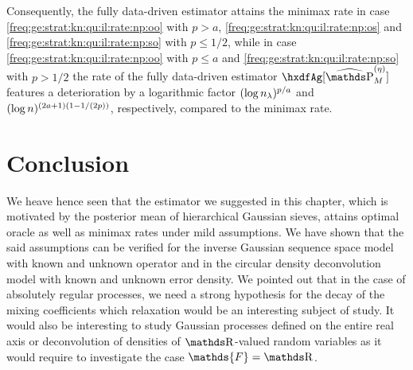 Consequently, the fully data-driven estimator attains the minimax
  rate in case \ref{freq:ge:strat:kn:qu:il:rate:np:oo} with $p>a$,
  \ref{freq:ge:strat:kn:qu:il:rate:np:os} and \ref{freq:ge:strat:kn:qu:il:rate:np:so} with
  $p\leq1/2$, while in  case \ref{freq:ge:strat:kn:qu:il:rate:np:oo} with $p\leq a$ and
  \ref{freq:ge:strat:kn:qu:il:rate:np:so} with $p>1/2$ the rate of the fully data-driven estimator
  $\hxdfAg[{\erWe[]}]$ features a deterioration by a logarithmic factor
  $(\log n_{\lambda})^{p/a}$  and $(\log n)^{(2a+1)(1-1/(2p))}$,
  respectively, compared to the minimax  rate.
  
\section{Conclusion}
We heave hence seen that the estimator we suggested in this chapter, which is motivated by the posterior mean of hierarchical Gaussian sieves, attains optimal oracle as well as minimax rates under mild assumptions.
We have shown that the said assumptions can be verified for the inverse Gaussian sequence space model with known and unknown operator and in the circular density deconvolution model with known and unknown error density.
We pointed out that in the case of absolutely regular processes, we need a strong hypothesis for the decay of the mixing coefficients which relaxation would be an interesting subject of study.
It would also be interesting to study Gaussian processes defined on the entire real axis or deconvolution of densities of $\R$-valued random variables as it would require to investigate the case $\mathds{F} = \R$.